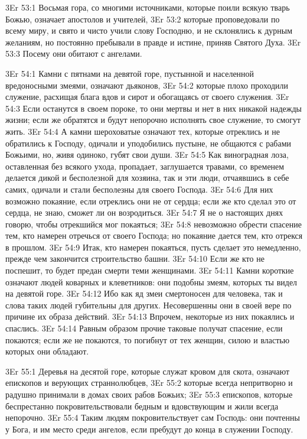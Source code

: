 \vs 3Er 53:1
Восьмая гора, со многими
источниками, которые поили всякую тварь Божью, означает апостолов и учителей,
\vs 3Er 53:2
которые проповедовали по
всему миру, и свято и чисто учили слову Господню, и не склонялись к дурным
желаниям, но постоянно пребывали в правде и истине, приняв Святого Духа.
\vs 3Er 53:3
Посему они обитают с
ангелами.

\vs 3Er 54:1
Камни с пятнами на девятой
горе, пустынной и населенной вредоносными змеями, означают дьяконов,
\vs 3Er 54:2
которые плохо проходили
служение, расхищая блага вдов и сирот и обогащаясь от своего служения.
\vs 3Er 54:3
Если останутся в своем
пороке, то они мертвы и нет в них никакой надежды жизни; если же обратятся и
будут непорочно исполнять свое служение, то смогут жить.
\vs 3Er 54:4
А камни шероховатые
означают тех, которые отреклись и не обратились к Господу, одичали и
уподобились пустыне, не общаются с рабами Божьими, но, живя одиноко, губят
свои души.
\vs 3Er 54:5
Как виноградная лоза,
оставленная без всякого ухода, пропадает, заглушается травами, со временем
делается дикой и бесполезной для хозяина, так и эти люди, отчаявшись в себе
самих, одичали и стали бесполезны для своего Господа.
\vs 3Er 54:6
Для них возможно покаяние,
если отреклись они не от сердца; если же кто сделал это от сердца, не знаю,
сможет ли он возродиться.
\vs 3Er 54:7
Я не о настоящих днях
говорю, чтобы отрекшийся мог покаяться;
\vs 3Er 54:8
невозможно обрести
спасение тем, кто намерен отречься от своего Господа; но покаяние дается
тем, кто отрекся в прошлом.
\vs 3Er 54:9
Итак, кто намерен
покаяться, пусть сделает это немедленно, прежде чем закончится строительство
башни.
\vs 3Er 54:10
Если же кто не поспешит,
то будет предан смерти теми женщинами.
\vs 3Er 54:11
Камни короткие означают
людей коварных и клеветников: они подобны змеям, которых ты видел на девятой
горе.
\vs 3Er 54:12
Ибо как яд змеи
смертоносен для человека, так и слова таких людей губительны для других.
Несовершенны они в своей вере по причине их образа действий.
\vs 3Er 54:13
Впрочем, некоторые из
них покаялись и спаслись.
\vs 3Er 54:14
Равным образом прочие
таковые получат спасение, если покаются; если же не покаются, то погибнут от
тех женщин, силою и властью которых они обладают.

\vs 3Er 55:1
Деревья на десятой горе,
которые служат кровом для скота, означают епископов и верующих страннолюбцев,
\vs 3Er 55:2
которые всегда непритворно
и радушно принимали в домах своих рабов Божьих;
\vs 3Er 55:3
епископов, которые
беспрестанно покровительствовали бедным и вдовствующим и жили всегда
непорочно.
\vs 3Er 55:4
Таким людям
покровительствует сам Господь: они почтенны у Бога, и им место среди ангелов,
если пребудут до конца в служении Господу.

